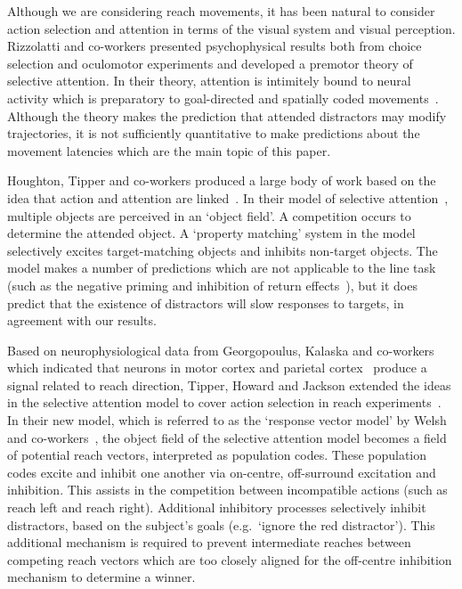 \documentclass[10pt,letterpaper]{article}
\begin{document}
Although we are considering reach movements, it has been natural to
consider action selection and attention in terms of the visual system
and visual perception. Rizzolatti and co-workers presented
psychophysical results both from choice selection and oculomotor
experiments and developed a premotor theory of selective attention. In
their theory, attention is intimitely bound to neural activity which
is preparatory to goal-directed and spatially coded
movements~\cite{rizzolatti_space_1994}. Although the theory makes the
prediction that attended distractors may modify trajectories, it is
not sufficiently quantitative to make predictions about the movement
latencies which are the main topic of this paper.

Houghton, Tipper and co-workers produced a large body of work based on
the idea that action and attention are
linked~\cite{tipper_selective_1992,
  houghton_model_1994,houghton_inhibition_1996,tipper_selective_1997,
  tipper_actionbased_1998,tipper_reaching_2001}. In their model of
selective
attention~\cite{houghton_model_1994,houghton_inhibition_1996},
multiple objects are perceived in an `object field'. A competition
occurs to determine the attended object. A `property matching' system
in the model selectively excites target-matching objects and inhibits
non-target objects. The model makes a number of predictions which are
not applicable to the line task (such as the negative priming and
inhibition of return effects~\cite{houghton_model_1994}), but it does
predict that the existence of distractors will slow responses to
targets, in agreement with our results.

Based on neurophysiological data from Georgopoulus, Kalaska and
co-workers which indicated that neurons in motor
cortex\cite{georgopoulos_neuronal_1986} and parietal
cortex~\cite{kalaska_cortical_1983} produce a signal related to reach
direction, Tipper, Howard and Jackson extended the ideas in the
selective attention model to cover action selection in reach
experiments~\cite{tipper_selective_1997}. In their new model, which is
referred to as the `response vector model' by Welsh and
co-workers~\cite{welsh_movement_2004}, the object field of the
selective attention model becomes a field of potential reach vectors,
interpreted as population codes.  These population codes excite and
inhibit one another via on-centre, off-surround excitation and
inhibition. This assists in the competition between incompatible
actions (such as reach left and reach right). Additional inhibitory
processes selectively inhibit distractors, based on the subject's
goals (e.g.~`ignore the red distractor'). This additional mechanism is
required to prevent intermediate reaches between competing reach
vectors which are too closely aligned for the off-centre inhibition
mechanism to determine a winner.
\end{document}
